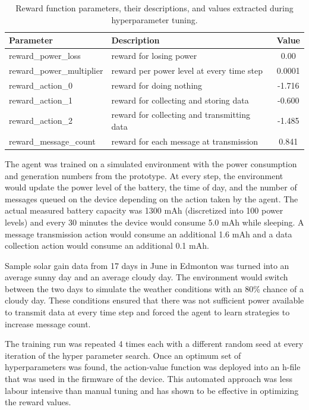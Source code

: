\documentclass[10pt]{cai}
\begin{document}
\begin{table}[h]
  \centering
  \begin{tabular}{l p{8cm} c}
      \toprule
      \textbf{Parameter} & \textbf{Description} & \textbf{Value} \\
      \midrule
      reward\_power\_loss & reward for losing power & 0.00  \\ 
      reward\_power\_multiplier & reward per power level at every time step & 0.0001  \\ 
      reward\_action\_0 & reward for doing nothing & -1.716 \\ 
      reward\_action\_1 & reward for collecting and storing data & -0.600 \\ 
      reward\_action\_2 & reward for collecting and transmitting data & -1.485 \\ 
      reward\_message\_count & reward for each message at transmission & 0.841 \\ 
      \bottomrule
  \end{tabular}
  \caption{Reward function parameters, their descriptions, and values extracted during hyperparameter tuning.}
  \label{tab:reward_parameters}
\end{table}

The agent was trained on a simulated environment with the power consumption and generation numbers from the prototype.
At every step, the environment would update the power level of the battery, the time of day, and the number of messages queued on the device depending on the action taken by the agent.
The actual measured battery capacity was 1300 mAh (discretized into 100 power levels) and every 30 minutes the device would consume 5.0 mAh while sleeping.
A message transmission action would consume an additional 1.6 mAh and a data collection action would consume an additional 0.1 mAh.

Sample solar gain data from 17 days in June in Edmonton was turned into an average sunny day and an average cloudy day. 
The environment would switch between the two days to simulate the weather conditions with an 80\% chance of a cloudy day.
These conditions ensured that there was not sufficient power available to transmit data at every time step and forced the agent to learn strategies to increase message count.

The training run was repeated 4 times each with a different random seed at every iteration of the hyper parameter search.
Once an optimum set of hyperparameters was found, the action-value function was deployed into an h-file that was used in the firmware of the device.
This automated approach was less labour intensive than manual tuning and has shown to be effective in optimizing the reward values.
\end{document}
